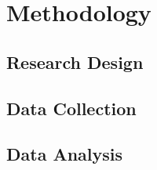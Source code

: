 


\chapter{Methodology}
\section{Research Design}
\lipsum[8]
\section{Data Collection}
\lipsum[9]
\section{Data Analysis}
\lipsum[10]